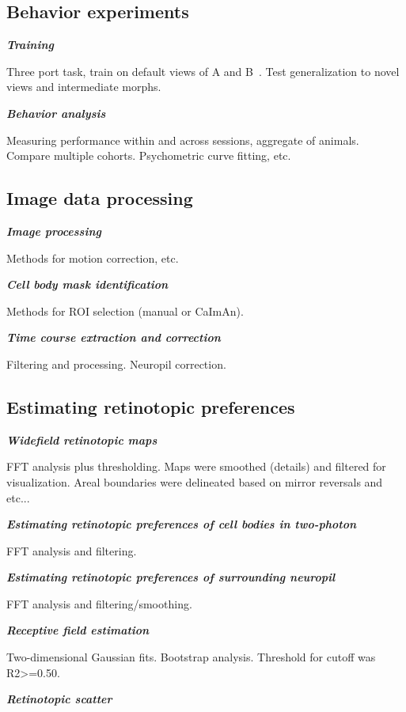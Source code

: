 \documentclass{article}
\begin{document}
\subsection{Behavior experiments}
\textbf{\textit{Training}}

Three port task, train on default views of A and B~\cite{Zoccolan2009}. Test generalization to novel views and intermediate morphs. 

\textbf{\textit{Behavior analysis}}

Measuring performance within and across sessions, aggregate of animals. Compare multiple cohorts.
Psychometric curve fitting, etc.

\subsection{Image data processing}
\textbf{\textit{Image processing}}

Methods for motion correction, etc.

\textbf{\textit{Cell body mask identification}}

Methods for ROI selection (manual or CaImAn).

\textbf{\textit{Time course extraction and correction}}

Filtering and processing. Neuropil correction.

\subsection{Estimating retinotopic preferences} 

\textbf{\textit{Widefield retinotopic maps}}

FFT analysis plus thresholding. Maps were smoothed (details) and filtered for visualization. Areal boundaries were delineated based on mirror reversals and etc...

\textbf{\textit{Estimating retinotopic preferences of cell bodies in two-photon}}

FFT analysis and filtering.


\textbf{\textit{Estimating retinotopic preferences of surrounding neuropil}}

FFT analysis and filtering/smoothing.

\textbf{\textit{Receptive field estimation}}

Two-dimensional Gaussian fits.  Bootstrap analysis. 
Threshold for cutoff was R2>=0.50.

\textbf{\textit{Retinotopic scatter}}
\end{document}
